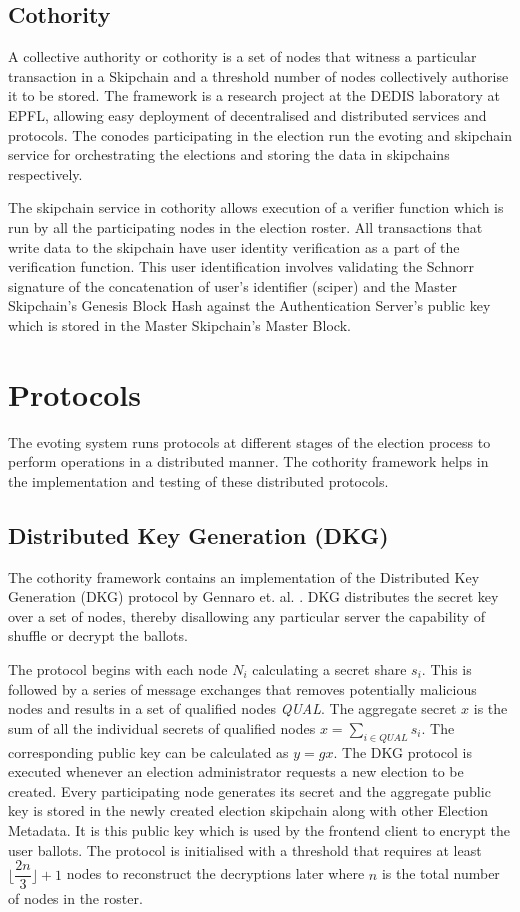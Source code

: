 \subsection{Cothority}

A collective authority or cothority \cite{cothority} is a set of nodes that witness a particular transaction in a Skipchain and a threshold number of nodes collectively authorise it to be stored. The framework is a research project at the DEDIS laboratory at EPFL, allowing easy deployment of decentralised and distributed services and protocols. The conodes participating in the election run the evoting and skipchain service for orchestrating the elections and storing the data in skipchains respectively.

The skipchain service in cothority allows execution of a verifier function which is run by all the participating nodes in the election roster. All transactions that write data to the skipchain have user identity verification as a part of the verification function. This user identification involves validating the  Schnorr signature of the concatenation of user's identifier (sciper) and the Master Skipchain's Genesis Block Hash against the Authentication Server's public key which is stored in the Master Skipchain's Master Block.

\section{Protocols}

The evoting system runs protocols at different stages of the election process to perform operations in a distributed manner. The cothority framework helps in the implementation and testing of these distributed protocols.

\subsection{Distributed Key Generation (DKG)}
The cothority framework contains an implementation of the Distributed Key Generation (DKG) protocol by Gennaro et. al. \cite{gennaro1999secure}. DKG distributes the secret key over a set of nodes, thereby disallowing any particular server the capability of shuffle or decrypt the ballots.

The protocol begins with each node $N_i$ calculating a secret share $s_i$. This is followed by a series of message exchanges that removes potentially malicious nodes and results in a set of qualified nodes \textit{QUAL}. The aggregate secret $x$ is the sum of all the individual secrets of qualified nodes
$x = \sum_{i \in \textit{QUAL}}s_i$. The corresponding public key can be calculated as $y = gx$. The DKG protocol is executed whenever an election administrator requests a new election to be created. Every participating node generates its secret and the aggregate public key is stored in the newly created election skipchain along with other Election Metadata. It is this public key which is used by the frontend client to encrypt the user ballots. The protocol is initialised with a threshold that requires at least \( \lfloor\dfrac{2n}{3}\rfloor + 1 \) nodes to reconstruct the decryptions later where $n$ is the total number of nodes in the roster.


